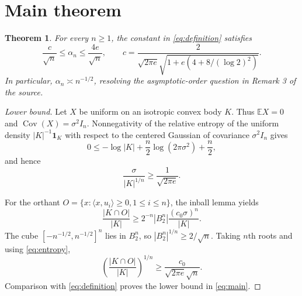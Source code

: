 \documentclass[11pt]{article}
\newtheorem{theorem}{Theorem}
\newcommand{\E}{\mathbb E}
\begin{document}
\section{Main theorem}

\begin{theorem}
For every $n\ge1$, the constant in \eqref{eq:definition} satisfies
\begin{equation}
 \frac{c}{\sqrt n}\le\alpha_n\le\frac{4e}{\sqrt n},
 \qquad
 c=\frac{2}{\sqrt{2\pi e}\sqrt{1+e(4+8/(\log2)^2)}}.
 \label{eq:main}
\end{equation}
In particular, $\alpha_n\asymp n^{-1/2}$, resolving the asymptotic-order
question in Remark 3 of the source.
\end{theorem}

\begin{proof}[Lower bound]
Let $X$ be uniform on an isotropic convex body $K$.  Thus $\E X=0$ and
$\operatorname{Cov}(X)=\sigma^2I_n$.  Nonnegativity of the relative entropy
of the uniform density $|K|^{-1}\mathbf1_K$ with respect to the centered
Gaussian of covariance $\sigma^2I_n$ gives
\[
 0\le-\log|K|+\frac n2\log(2\pi\sigma^2)+\frac n2,
\]
and hence
\begin{equation}
 \frac{\sigma}{|K|^{1/n}}\ge\frac1{\sqrt{2\pi e}}.
 \label{eq:entropy}
\end{equation}

For the orthant $O=\{x:\langle x,u_i\rangle\ge0,1\le i\le n\}$, the inball
lemma yields
\[
 \frac{|K\cap O|}{|K|}
 \ge 2^{-n}|B_2^n|\frac{(c_0\sigma)^n}{|K|}.
\]
The cube $[-n^{-1/2},n^{-1/2}]^n$ lies in $B_2^n$, so
$|B_2^n|^{1/n}\ge2/\sqrt n$.  Taking $n$th roots and using
\eqref{eq:entropy},
\[
 \left(\frac{|K\cap O|}{|K|}\right)^{1/n}
 \ge\frac{c_0}{\sqrt{2\pi e}\sqrt n}.
\]
Comparison with \eqref{eq:definition} proves the lower bound in
\eqref{eq:main}.
\end{proof}
\end{document}
